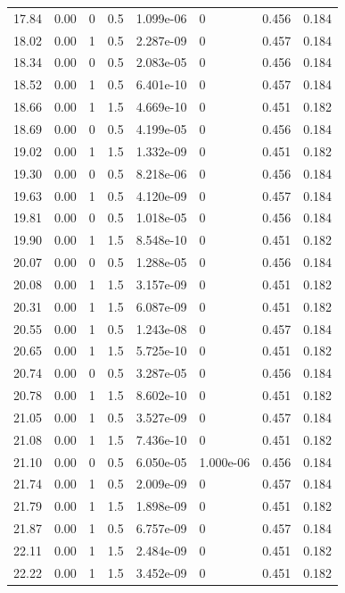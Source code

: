 \documentclass[preview]{standalone}
\begin{document}
{{{\begin{tabular}{L{1.2cm}C{1.2cm} C{0.3cm}C{0.5cm} C{1.4cm}C{1.4cm} C{1.4cm}C{1.4cm}}
  17.84  &  0.00  & 0     & 0.5 &  1.099e-06  & 0  & 0.456 &  0.184   \\ 
  18.02  &  0.00  & 1     & 0.5 &  2.287e-09  & 0  & 0.457 &  0.184   \\ 
  18.34  &  0.00  & 0     & 0.5 &  2.083e-05  & 0  & 0.456 &  0.184   \\ 
  18.52  &  0.00  & 1     & 0.5 &  6.401e-10  & 0  & 0.457 &  0.184   \\ 
  18.66  &  0.00  & 1     & 1.5 &  4.669e-10  & 0  & 0.451 &  0.182   \\ 
  18.69  &  0.00  & 0     & 0.5 &  4.199e-05  & 0  & 0.456 &  0.184   \\ 
  19.02  &  0.00  & 1     & 1.5 &  1.332e-09  & 0  & 0.451 &  0.182   \\ 
  19.30  &  0.00  & 0     & 0.5 &  8.218e-06  & 0  & 0.456 &  0.184   \\ 
  19.63  &  0.00  & 1     & 0.5 &  4.120e-09  & 0  & 0.457 &  0.184   \\ 
  19.81  &  0.00  & 0     & 0.5 &  1.018e-05  & 0  & 0.456 &  0.184   \\ 
  19.90  &  0.00  & 1     & 1.5 &  8.548e-10  & 0  & 0.451 &  0.182   \\ 
  20.07  &  0.00  & 0     & 0.5 &  1.288e-05  & 0  & 0.456 &  0.184   \\ 
  20.08  &  0.00  & 1     & 1.5 &  3.157e-09  & 0  & 0.451 &  0.182   \\ 
  20.31  &  0.00  & 1     & 1.5 &  6.087e-09  & 0  & 0.451 &  0.182   \\ 
  20.55  &  0.00  & 1     & 0.5 &  1.243e-08  & 0  & 0.457 &  0.184   \\ 
  20.65  &  0.00  & 1     & 1.5 &  5.725e-10  & 0  & 0.451 &  0.182   \\ 
  20.74  &  0.00  & 0     & 0.5 &  3.287e-05  & 0  & 0.456 &  0.184   \\ 
  20.78  &  0.00  & 1     & 1.5 &  8.602e-10  & 0  & 0.451 &  0.182   \\ 
  21.05  &  0.00  & 1     & 0.5 &  3.527e-09  & 0  & 0.457 &  0.184   \\ 
  21.08  &  0.00  & 1     & 1.5 &  7.436e-10  & 0  & 0.451 &  0.182   \\ 
  21.10  &  0.00  & 0     & 0.5 &  6.050e-05  & 1.000e-06  & 0.456 &  0.184   \\ 
  21.74  &  0.00  & 1     & 0.5 &  2.009e-09  & 0  & 0.457 &  0.184   \\ 
  21.79  &  0.00  & 1     & 1.5 &  1.898e-09  & 0  & 0.451 &  0.182   \\ 
  21.87  &  0.00  & 1     & 0.5 &  6.757e-09  & 0  & 0.457 &  0.184   \\ 
  22.11  &  0.00  & 1     & 1.5 &  2.484e-09  & 0  & 0.451 &  0.182   \\ 
  22.22  &  0.00  & 1     & 1.5 &  3.452e-09  & 0  & 0.451 &  0.182   \\ 
\hline 
\end{tabular} 

}}}
\end{document}
